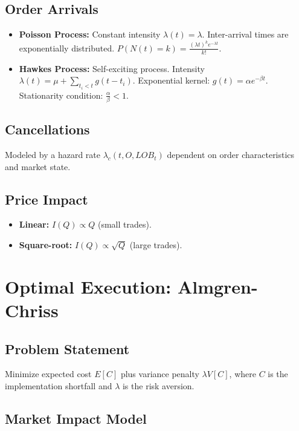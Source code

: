 \documentclass{article}
\begin{document}
\subsection{Order Arrivals}

\begin{itemize}
    \item \textbf{Poisson Process:} Constant intensity $\lambda(t) = \lambda$. Inter-arrival times are exponentially distributed.  $P(N(t) = k) = \frac{(\lambda t)^k e^{-\lambda t}}{k!}$.
    \item \textbf{Hawkes Process:} Self-exciting process. Intensity $\lambda(t) = \mu + \sum_{t_i < t} g(t - t_i)$. Exponential kernel: $g(t) = \alpha e^{-\beta t}$. Stationarity condition: $\frac{\alpha}{\beta} < 1$.
\end{itemize}

\subsection{Cancellations}

Modeled by a hazard rate $\lambda_c(t, O, LOB_t)$ dependent on order characteristics and market state.

\subsection{Price Impact}

\begin{itemize}
    \item \textbf{Linear:} $I(Q) \propto Q$ (small trades).
    \item \textbf{Square-root:} $I(Q) \propto \sqrt{Q}$ (large trades).
\end{itemize}

\section{Optimal Execution: Almgren-Chriss}

\subsection{Problem Statement}

Minimize expected cost $E[C]$ plus variance penalty $\lambda V[C]$, where $C$ is the implementation shortfall and $\lambda$ is the risk aversion.

\subsection{Market Impact Model}
\end{document}
